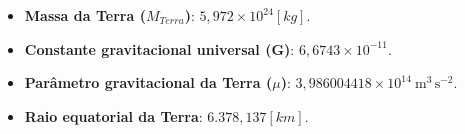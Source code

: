 \begin{itemize}
    \item \textbf{Massa da Terra ($M_{Terra}$)}:
    $5{,}972\times10^{24}[kg]$.
    \item \textbf{Constante gravitacional universal (G)}:
    $6{,}6743\times10^{-11}$.
    \item \textbf{Parâmetro gravitacional da Terra ($\mu$)}:
    $3{,}986004418\times 10^{14}\ \mathrm{m^3\,s^{-2}}$.
    \item \textbf{Raio equatorial da Terra}:
    $6.378{,}137[km]$.
\end{itemize}